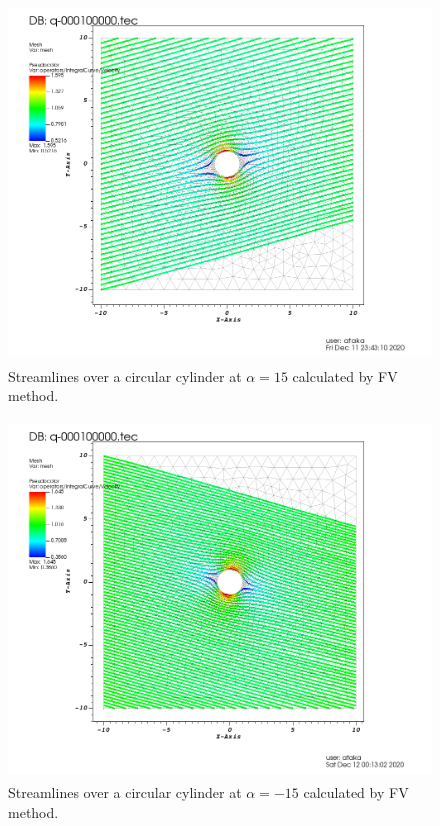\documentclass[letterpaper,12pt]{article}
\begin{document}
\begin{figure} [!h]
	\centering
	\includegraphics[height = 9.5cm]{graph/15deg/Cylinder_15angle_streamline0000.png}
	\caption{Streamlines over a circular cylinder at $\alpha=15$ calculated by FV method.}
    \label{fig:q2st15}
\end{figure}

\begin{figure} [!h]
	\centering
	\includegraphics[height = 9.5cm]{graph/neg15deg/Cylinder_neg15angle_streamline0000.png}
	\caption{Streamlines over a circular cylinder at $\alpha=-15$ calculated by FV method.}
    \label{fig:q2st-15}
\end{figure}

\newpage
\end{document}
